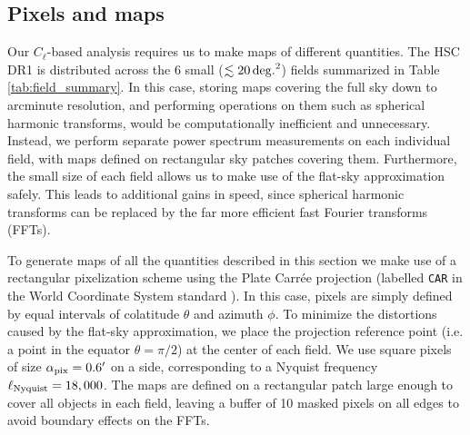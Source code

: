 \documentclass[a4paper,11pt]{article}
\begin{document}
  \subsection{Pixels and maps}\label{ssec:methods.pix}
    Our $C_\ell$-based analysis requires us to make maps of different quantities. The HSC DR1 is distributed across the 6 small ($\lesssim20\,{\rm deg.}^2$) fields summarized in Table \ref{tab:field_summary}. In this case, storing maps covering the full sky down to arcminute resolution, and performing operations on them such as spherical harmonic transforms, would be computationally inefficient and unnecessary. Instead, we perform separate power spectrum measurements on each individual field, with maps defined on rectangular sky patches covering them. Furthermore, the small size of each field allows us to make use of the flat-sky approximation safely. This leads to additional gains in speed, since spherical harmonic transforms can be replaced by the far more efficient fast Fourier transforms (FFTs).
    
    To generate maps of all the quantities described in this section we make use of a rectangular pixelization scheme using the Plate Carr\'ee projection (labelled {\tt CAR} in the World Coordinate System standard \cite{2002A&A...395.1077C}). In this case, pixels are simply defined by equal intervals of colatitude $\theta$ and azimuth $\phi$. To minimize the distortions caused by the flat-sky approximation, we place the projection reference point (i.e. a point in the equator $\theta=\pi/2$) at the center of each field. We use square pixels of size $\alpha_{\rm pix}=0.6'$ on a side, corresponding to a Nyquist frequency $\ell_{\rm Nyquist}=18,000$. The maps are defined on a rectangular patch large enough to cover all objects in each field, leaving a buffer of 10 masked pixels on all edges to avoid boundary effects on the FFTs.
  
\end{document}
